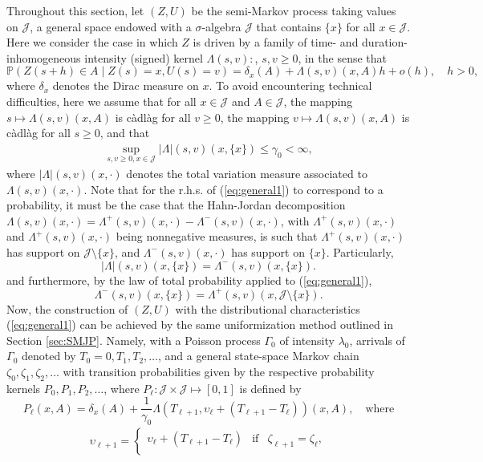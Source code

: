 \documentclass[11pt,leqno]{amsart}
\numberwithin{table}{section}
\numberwithin{figure}{section}
\numberwithin{equation}{section}
\newcommand{\1}{{\mathds{1}}}
\newcommand{\0}{\mat{0}}
\begin{document}
{{Throughout this section, let $(Z,U)$ be the semi-Markov process taking values on $\mathcal{J}$, a general space endowed with a $\sigma$-algebra $\mathscr{J}$ that contains $\{x\}$ for all $x\in\mathcal{J}$. Here we consider the case in which $Z$ is driven by a family of time- and duration-inhomogeneous intensity (signed) kernel $\Lambda(s,v):$, $s,v\ge 0$, in the sense that
\begin{equation}\label{eq:general1}\mathds{P}(Z(s+h)\in A\mid Z(s)=x,U(s)=v)=\delta_x(A)+\Lambda(s,v)(x,A) h+ o(h), \quad h>0,
\end{equation}
where $\delta_x$ denotes the Dirac measure on $x$. To avoid encountering technical difficulties, here we assume that for all $x\in \mathcal{J}$ and $A\in\mathscr{J}$, the mapping $s\mapsto \Lambda(s,v)(x,A)$ is c\`adl\`ag for all $v\ge 0$, the mapping $v\mapsto \Lambda(s,v)(x,A)$ is c\`adl\`ag for all $s\ge 0$, and that
\begin{align*}
\sup_{s,v\ge 0, x\in\mathcal{J}}|\Lambda|(s,v)(x,\{x\})\le\gamma_0<\infty,
\end{align*}
where $|\Lambda|(s,v)(x,\cdot)$ denotes the total variation measure associated to $\Lambda(s,v)(x,\cdot)$. Note that for the r.h.s. of (\ref{eq:general1}) to correspond to a probability, it must be the case that the Hahn-Jordan decomposition $\Lambda(s,v)(x,\cdot)=\Lambda^+(s,v)(x,\cdot)-\Lambda^-(s,v)(x,\cdot)$, with $\Lambda^+(s,v)(x,\cdot)
$ and $\Lambda^+(s,v)(x,\cdot)$ being nonnegative measures, is such that $\Lambda^+(s,v)(x,\cdot)$ has support on $\mathcal{J}\setminus\{x\}$, and $\Lambda^-(s,v)(x,\cdot)$ has support on $\{x\}$. Particularly,
\[|\Lambda|(s,v)(x,\{x\})=\Lambda^-(s,v)(x,\{x\}).\]
and furthermore, by the law of total probability applied to (\ref{eq:general1}),
\[\Lambda^-(s,v)(x,\{x\})=\Lambda^+(s,v)(x,\mathcal{J}\setminus\{x\}).\]
Now, the construction of $(Z,U)$ with the distributional characteristics (\ref{eq:general1}) can be achieved by the same uniformization method outlined in Section \ref{sec:SMJP}. Namely, with a Poisson process $\Gamma_0$ of intensity $\lambda_0$, arrivals of $\Gamma_0$ denoted by $T_0=0,T_1,T_2,\dots$, and a general state-space Markov chain $\zeta_0, \zeta_1,\zeta_2,\dots$ with transition probabilities given by the respective probability kernels $P_0,P_1,P_2,\dots$, where $P_\ell:\mathcal{J}\times\mathscr{J}\mapsto[0,1]$ is defined by
\[P_\ell(x,A)=\delta_x(A)+\frac{1}{\gamma_0}\Lambda(T_{\ell+1}, \upsilon_{\ell} + (T_{\ell+1}-T_\ell))(x,A),\quad\mbox{where}\]
\begin{align*}
\upsilon_{\ell+1} = \left\{\begin{array}{ccc} \upsilon_{\ell} + (T_{\ell+1}-T_\ell) & \text{if} & \zeta_{\ell+1}=\zeta_{\ell},\\

\end{array}
\end{align*}}}
\end{document}
